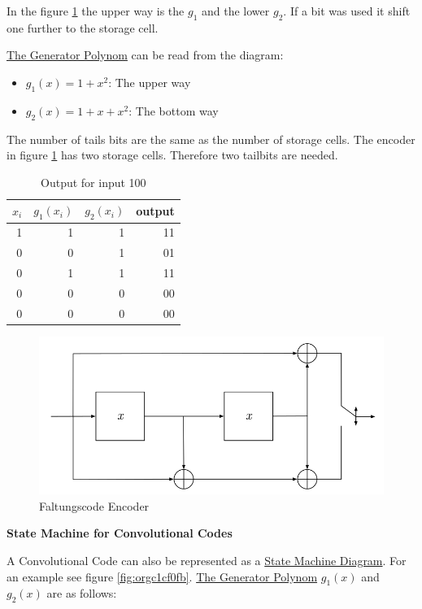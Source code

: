 \documentclass[11pt,twoside,twocolumn,landscape]{article}
\begin{document}
In the figure \ref{fig:org64ec162}  the upper way is the \(g_1\) and the lower \(g_2\).
If a bit was used it shift one further to the storage cell.

\href{../../../roam/20211105145648-the_generator_polynom_for_hamming_codes.org}{The Generator Polynom} can be read from the diagram:
\begin{itemize}
\item \(g_1(x) = 1 + x^2\): The upper way
\item \(g_2(x) = 1 + x + x^2\): The bottom way
\end{itemize}


The number of tails bits are the same as the number of storage cells.
The encoder in figure \ref{fig:org64ec162} has two storage cells.
Therefore two tailbits are needed.


\begin{table}[htbp]
\caption{\label{tab:orgcbfaa77}Output for input 100}
\centering
\begin{tabular}{rrrr}
\(x_i\) & \(g_1(x_i)\) & \(g_2(x_i)\) & output\\
\hline
1 & 1 & 1 & 11\\
0 & 0 & 1 & 01\\
0 & 1 & 1 & 11\\
0 & 0 & 0 & 00\\
0 & 0 & 0 & 00\\
\end{tabular}
\end{table}

\begin{figure}[htbp]
\centering
\includegraphics[width=.9\linewidth]{img/encoders_faltungscodes.png}
\caption{\label{fig:org64ec162}Faltungscode Encoder}
\end{figure}


\textbf{State Machine for Convolutional Codes}

A Convolutional Code can also be represented as a \href{../../../roam/20211108155646-state_machine_diagram.org}{State Machine Diagram}.
For an example see figure \ref{fig:orgc1cf0fb}.
\href{../../../roam/20211105145648-the_generator_polynom_for_hamming_codes.org}{The Generator Polynom} \(g_1(x)\) and \(g_2(x)\) are as follows:
\end{document}
